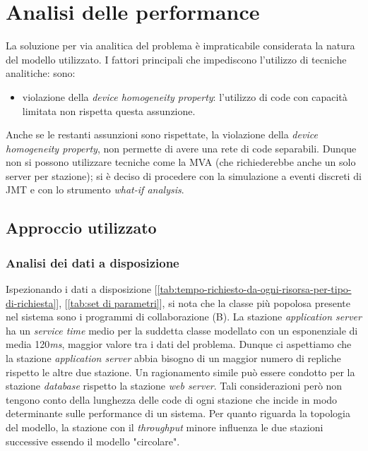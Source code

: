 \documentclass[../main.tex]{subfiles}
\begin{document}
    \chapter{Analisi delle performance}\label{ch:analisi-delle-performance}

    La soluzione per via analitica del problema è impraticabile considerata la natura del modello utilizzato.
    I fattori principali che impediscono l’utilizzo di tecniche analitiche:
    sono:
    \begin{itemize}
        \item violazione della \textit{device homogeneity property}: l'utilizzo di code con capacità limitata non
        rispetta questa assunzione.
    \end{itemize}
    Anche se le restanti assunzioni sono rispettate, la violazione della \textit{device homogeneity property}, non
    permette di avere una rete di code separabili.
    Dunque non si possono utilizzare tecniche come la MVA (che richiederebbe anche un solo server per stazione); si è
    deciso di procedere con la simulazione a eventi discreti di JMT e con lo strumento \textit{what-if analysis}.


    \section{Approccio utilizzato}\label{sec:approccio-utilizzato}

    \subsection{Analisi dei dati a disposizione}\label{subsec:analisi-dei-dati-a-disposizione}
    Ispezionando i dati a disposizione [\ref{tab:tempo-richiesto-da-ogni-risorsa-per-tipo-di-richiesta}],
    [\ref{tab:set di parametri}], si nota che la classe più popolosa presente nel sistema sono i programmi di
    collaborazione (B). La stazione \textit{application server} ha un \textit{service time} medio per la suddetta classe
    modellato con un esponenziale di media 120\textit{ms}, maggior valore tra i dati del problema.
    Dunque ci aspettiamo che la stazione \textit{application server} abbia bisogno di un maggior numero di repliche
    rispetto le altre due stazione.
    Un ragionamento simile può essere condotto per la stazione \textit{database} rispetto la stazione
    \textit{web server}.
    Tali considerazioni però non tengono conto della lunghezza delle code di ogni stazione che incide in modo
    determinante sulle performance di un sistema.
    Per quanto riguarda la topologia del modello, la stazione con il \textit{throughput} minore influenza le
    due stazioni successive essendo il modello "circolare".
\end{document}
